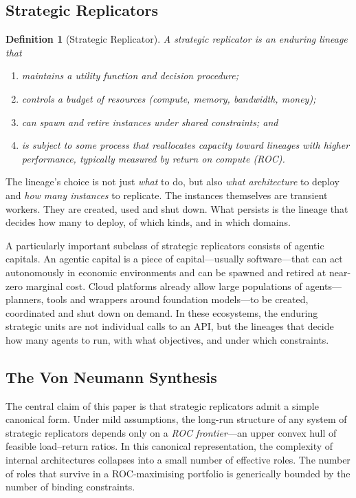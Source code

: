 \documentclass[12pt]{article}
\newtheorem{definition}[theorem]{Definition}
\begin{document}
\subsection{Strategic Replicators}

\begin{definition}[Strategic Replicator]
\label{def:strategic-replicator}
A \emph{strategic replicator} is an enduring lineage that
\begin{enumerate}
    \item maintains a utility function and decision procedure;
    \item controls a budget of resources (compute, memory, bandwidth, money);
    \item can spawn and retire instances under shared constraints; and
    \item is subject to some process that reallocates capacity toward lineages with higher performance, typically measured by return on compute (ROC).
\end{enumerate}
\end{definition}

The lineage's choice is not just \emph{what} to do, but also \emph{what architecture} to deploy and \emph{how many instances} to replicate. The instances themselves are transient workers. They are created, used and shut down. What persists is the lineage that decides how many to deploy, of which kinds, and in which domains.

A particularly important subclass of strategic replicators consists of agentic capitals. An agentic capital is a piece of capital---usually software---that can act autonomously in economic environments and can be spawned and retired at near-zero marginal cost. Cloud platforms already allow large populations of agents---planners, tools and wrappers around foundation models---to be created, coordinated and shut down on demand. In these ecosystems, the enduring strategic units are not individual calls to an API, but the lineages that decide how many agents to run, with what objectives, and under which constraints.

\subsection{The Von Neumann Synthesis}

The central claim of this paper is that strategic replicators admit a simple canonical form. Under mild assumptions, the long-run structure of any system of strategic replicators depends only on a \emph{ROC frontier}---an upper convex hull of feasible load--return ratios. In this canonical representation, the complexity of internal architectures collapses into a small number of effective roles. The number of roles that survive in a ROC-maximising portfolio is generically bounded by the number of binding constraints.
\end{document}
